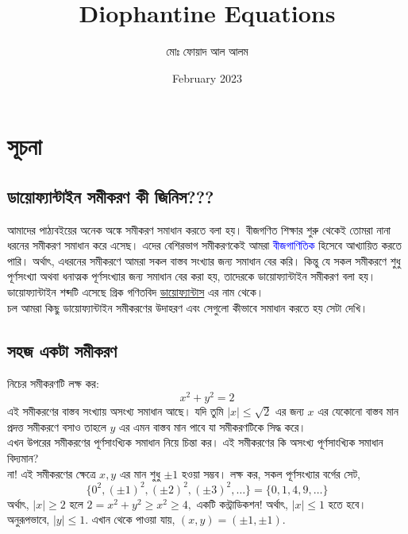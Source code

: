 \documentclass[11pt]{report}
\title{Diophantine Equations}
\author{মোঃ ফোয়াদ আল আলম}
\date{February 2023}
\begin{document}
\pdfpageheight=11.25in
\pdfpagewidth=8in

\maketitle

\tableofcontents

\chapter{সূচনা}

\section{ডায়োফ্যান্টাইন সমীকরণ কী জিনিস???}

আমাদের পাঠ্যবইয়ের অনেক অঙ্কে সমীকরণ সমাধান করতে বলা হয়। বীজগণিত শিক্ষার শুরু থেকেই তোমরা নানা ধরনের সমীকরণ সমাধান করে এসেছ। এদের বেশিরভাগ সমীকরণকেই আমরা \textcolor{blue}{বীজগাণিতিক} হিসেবে আখ্যায়িত করতে পারি। অর্থাৎ, এধরনের সমীকরণে আমরা সকল বাস্তব সংখ্যার জন্য সমাধান বের করি। কিন্তু যে সকল সমীকরণে শুধু পূর্ণসংখ্যা অথবা ধনাত্মক পূর্ণসংখ্যার জন্য সমাধান বের করা হয়, তাদেরকে ডায়োফ্যান্টাইন সমীকরণ বলা হয়। ডায়োফ্যান্টাইন শব্দটি এসেছে গ্রিক গণিতবিদ \href{https://en.wikipedia.org/wiki/Diophantus}{ডায়োফ্যান্টাস} এর নাম থেকে।\\

চল আমরা কিছু ডায়োফ্যান্টাইন সমীকরণের উদাহরণ এবং সেগুলো কীভাবে সমাধান করতে হয় সেটা দেখি।\\

\section{সহজ একটা সমীকরণ}

নিচের সমীকরণটি লক্ষ কর: $$x^2+y^2=2$$ এই সমীকরণের বাস্তব সংখ্যায় অসংখ্য সমাধান আছে। যদি তুমি $|x| \leq \sqrt{2}$ এর জন্য $x$ এর যেকোনো বাস্তব মান প্রদত্ত সমীকরণে বসাও তাহলে $y$ এর এমন বাস্তব মান পাবে যা সমীকরণটিকে সিদ্ধ করে।\\

এখন উপরের সমীকরণের পূর্ণসাংখ্যিক সমাধান নিয়ে চিন্তা কর। এই সমীকরণের কি অসংখ্য পূর্ণসাংখ্যিক সমাধান বিদ্যমান?\\

না! এই সমীকরণের ক্ষেত্রে $x, y$ এর মান শুধু $\pm 1$ হওয়া সম্ভব। লক্ষ কর, সকল পূর্ণসংখ্যার বর্গের সেট, $$\{0^2, (\pm 1)^2, (\pm 2)^2, (\pm 3)^2, \ldots\} = \{0, 1, 4, 9, \ldots\}$$ অর্থাৎ, $|x| \geq 2$ হলে $2=x^2+y^2 \geq x^2 \geq 4,$ একটি কন্ট্রাডিকশন! অর্থাৎ, $|x| \leq 1$ হতে হবে। অনুরূপভাবে, $|y| \leq 1.$ এখান থেকে পাওয়া যায়, $(x,y)=(\pm 1, \pm 1).$\\
\end{document}
